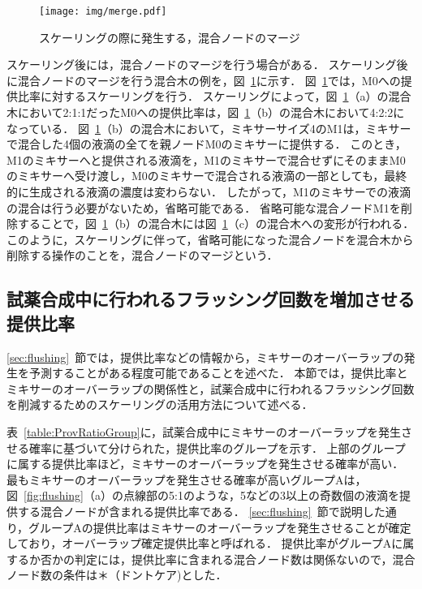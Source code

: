 \begin{figure}[tbp]
 \centering\texttt{[image: img/merge.pdf]}
 \caption{スケーリングの際に発生する，混合ノードのマージ}\label{fig:Merge}
\end{figure}

スケーリング後には，混合ノードのマージを行う場合がある．
スケーリング後に混合ノードのマージを行う混合木の例を，図~\ref{fig:Merge}に示す．
図~\ref{fig:Merge}では，M0への提供比率に対するスケーリングを行う．
スケーリングによって，図~\ref{fig:Merge}（a）の混合木において2:1:1だったM0への提供比率は，図~\ref{fig:Merge}（b）の混合木において4:2:2になっている．
図~\ref{fig:Merge}（b）の混合木において，ミキサーサイズ4のM1は，ミキサーで混合した4個の液滴の全てを親ノードM0のミキサーに提供する．
このとき，M1のミキサーへと提供される液滴を，M1のミキサーで混合せずにそのままM0のミキサーへ受け渡し，M0のミキサーで混合される液滴の一部としても，最終的に生成される液滴の濃度は変わらない．
したがって，M1のミキサーでの液滴の混合は行う必要がないため，省略可能である．
省略可能な混合ノードM1を削除することで，図~\ref{fig:Merge}（b）の混合木には図~\ref{fig:Merge}（c）の混合木への変形が行われる．
このように，スケーリングに伴って，省略可能になった混合ノードを混合木から削除する操作のことを，混合ノードのマージという．

\subsection{試薬合成中に行われるフラッシング回数を増加させる提供比率}\label{ratio}
\ref{sec:flushing}~節では，提供比率などの情報から，ミキサーのオーバーラップの発生を予測することがある程度可能であることを述べた．
本節では，提供比率とミキサーのオーバーラップの関係性と，試薬合成中に行われるフラッシング回数を削減するためのスケーリングの活用方法について述べる．

表~\ref{table:ProvRatioGroup}に，試薬合成中にミキサーのオーバーラップを発生させる確率に基づいて分けられた，提供比率のグループを示す．
上部のグループに属する提供比率ほど，ミキサーのオーバーラップを発生させる確率が高い．
最もミキサーのオーバーラップを発生させる確率が高いグループAは，図~\ref{fig:flushing}（a）の点線部の5:1のような，5などの3以上の奇数個の液滴を提供する混合ノードが含まれる提供比率である．
\ref{sec:flushing}~節で説明した通り，グループAの提供比率はミキサーのオーバーラップを発生させることが確定しており，オーバーラップ確定提供比率と呼ばれる．
提供比率がグループAに属するか否かの判定には，提供比率に含まれる混合ノード数は関係ないので，混合ノード数の条件は＊（ドントケア)とした．

